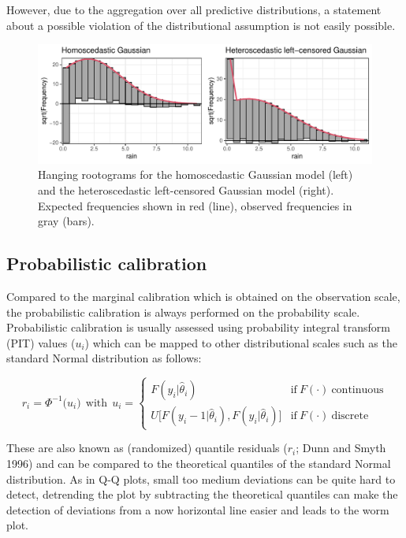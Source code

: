 \documentclass[twoside]{report}
\begin{document}
However, due to the aggregation over all predictive distributions, a statement
about a possible violation of the distributional assumption is not easily possible.

\begin{figure}[!ht]\centering
    \includegraphics[width=\textwidth]{Stauffer-rootograms}
    \caption{\label{stauffer:fig1}
        Hanging rootograms for the homoscedastic Gaussian model (left)
        and the heteroscedastic left-censored Gaussian model (right).
        Expected frequencies shown in red (line), observed frequencies
        in gray (bars).
    }
\end{figure}

\subsection{Probabilistic calibration}

Compared to the marginal calibration which is obtained on the observation
scale, the probabilistic calibration is always performed on the probability
scale. Probabilistic calibration is usually assessed using probability
integral transform (PIT) values ($u_i$) which can be mapped to other
distributional scales such as the standard Normal distribution as follows:

$$
r_i = \Phi^{-1}\big(u_i)~~\text{with}~~u_i = \begin{cases}
    F(y_i | \hat{\theta}_i) & \text{if}~F(\cdot)~\text{continuous}  \\
    U\big[F(y_i - 1 | \hat{\theta}_i), F(y_i | \hat{\theta}_i)\big] & \text{if}~F(\cdot)~\text{discrete}
\end{cases}
$$

These are also known as (randomized) quantile residuals ($r_i$; Dunn and Smyth
1996) and can be compared to the theoretical quantiles of the standard Normal
distribution.  As in Q-Q plots, small too medium deviations can be quite hard
to detect, detrending the plot by subtracting the theoretical quantiles can
make the detection of deviations from a now horizontal line easier and leads to
the worm plot.
\end{document}
